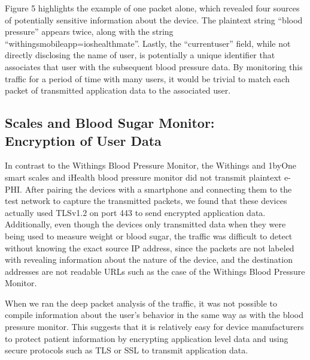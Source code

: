 Figure 5 highlights the example of one packet alone, which revealed four sources
of potentially sensitive information about the device. The plaintext string ``blood\textunderscore
pressure'' appears twice, along with the string ``withings\textunderscore mobile\textunderscore app=ios\textunderscore healthmate''. Lastly, the ``current\textunderscore user'' field, while not directly disclosing the name of user, is potentially a unique identifier that associates that user with the subsequent blood pressure data. By monitoring this traffic for a period of time with many users, it would be trivial to match each packet of transmitted application data to the associated user. 

\subsection{Scales and Blood Sugar Monitor: \\ Encryption of User Data}

In contrast to the Withings Blood Pressure Monitor, the Withings and 1byOne
smart scales and iHealth blood pressure monitor did not transmit plaintext
e-PHI. After pairing the devices with a smartphone and connecting them to the
test network to capture the transmitted packets, we found that these devices
actually used TLSv1.2 on port 443 to send encrypted application data.
Additionally, even though the devices only transmitted data when they were
being used to measure weight or blood sugar, the traffic was difficult to
detect without knowing the exact source IP address, since the packets are not
labeled with revealing information about the nature of the device, and the
destination addresses are not readable URLs such as the case of the Withings
Blood Pressure Monitor.

When we ran the deep packet analysis of the traffic, it was not
possible to compile information about the user's behavior in the same way as
with the blood pressure monitor. This suggests that it is relatively easy for
device manufacturers to protect patient information by encrypting
application level data and using secure protocols such as TLS or SSL to
transmit application data.




